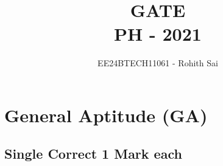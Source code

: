 \documentclass[journal]{IEEEtran}
\begin{document}

\vspace{3cm}

\title{GATE\\PH - 2021}
\author{EE24BTECH11061 - Rohith Sai}
\maketitle

\renewcommand{\thefigure}{\theenumi}
\renewcommand{\thetable}{\theenumi}

\section*{General Aptitude (GA)}
\subsection*{Single Correct 1 Mark each}
\end{document}
